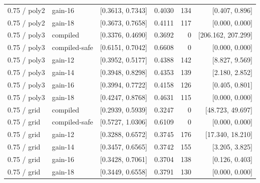 \begin{longtable}{@{}llrrrr@{}}
0.75 / poly2 & gain-16 & [0.3613, 0.7343] & 0.4030 & 134 & [0.407, 0.896]\\
0.75 / poly2 & gain-18 & [0.3673, 0.7658] & 0.4111 & 117 & [0.000, 0.000]\\
0.75 / poly3 & compiled & [0.3376, 0.4690] & 0.3692 & 0 & [206.162, 207.299]\\
0.75 / poly3 & compiled-safe & [0.6151, 0.7042] & 0.6608 & 0 & [0.000, 0.000]\\
0.75 / poly3 & gain-12 & [0.3952, 0.5177] & 0.4388 & 142 & [8.827, 9.569]\\
0.75 / poly3 & gain-14 & [0.3948, 0.8298] & 0.4353 & 139 & [2.180, 2.852]\\
0.75 / poly3 & gain-16 & [0.3994, 0.7722] & 0.4158 & 126 & [0.405, 0.801]\\
0.75 / poly3 & gain-18 & [0.4247, 0.8768] & 0.4631 & 115 & [0.000, 0.000]\\
0.75 / grid & compiled & [0.2939, 0.5939] & 0.3247 & 0 & [48.723, 49.697]\\
0.75 / grid & compiled-safe & [0.5727, 1.0306] & 0.6109 & 0 & [0.000, 0.000]\\
0.75 / grid & gain-12 & [0.3288, 0.6572] & 0.3745 & 176 & [17.340, 18.210]\\
0.75 / grid & gain-14 & [0.3457, 0.6565] & 0.3742 & 155 & [3.205, 3.825]\\
0.75 / grid & gain-16 & [0.3428, 0.7061] & 0.3704 & 138 & [0.126, 0.403]\\
0.75 / grid & gain-18 & [0.3449, 0.6558] & 0.3791 & 130 & [0.000, 0.000]\\
\bottomrule\end{longtable}\endgroup
\begingroup\scriptsize

